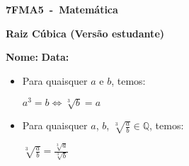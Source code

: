 \documentclass[a4paper,14pt]{article}
\begin{document}
	
	\noindent\textbf{7FMA5~-~Matemática} 
	
	\begin{center}
		\textbf{Raiz Cúbica (Versão estudante)}
	\end{center}
	
	\bigskip
	
	\noindent\textbf{Nome:} \underline{\hspace{10cm}}
    \noindent\textbf{Data:} \underline{\hspace{4cm}}
	
	\bigskip
	
	\begin{multicols}{2}
	\begin{itemize}
		\item Para quaisquer $a$ e $b$, temos:
		\begin{center}
			$a^3 = b \Leftrightarrow \sqrt[3]{b} = a$
		\end{center}
	    \item Para quaisquer $a$, $b$, $\sqrt[3]{\frac{a}{b}} \in \mathbb{Q}$, temos:
	    \begin{center}
	    	$\sqrt[3]{\frac{a}{b}} = \frac{\sqrt[3]{a}}{\sqrt[3]{b}}$
	    \end{center}  
	\end{itemize}
	\begin{enumerate}
		

\end{enumerate}
\end{multicols}
\end{document}
